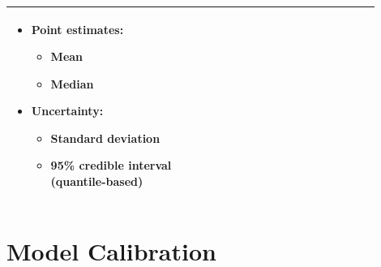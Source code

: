 \documentclass{article}
\begin{document}
\begin{appendix}
{\begin{table}[H]
\begin{tabular}{| p{0.45\linewidth} | p{0.45\linewidth} |}
\begin{itemize}
				\item Point estimates: 
				\begin{itemize}
					\item Mean 
					\item Median
				\end{itemize}
				\item Uncertainty: 
				\begin{itemize}
					\item Standard deviation
					\item 95\% credible interval (quantile-based)
				\end{itemize}
			\end{itemize}\\
		\hline 
	\end{tabular}
\end{table}}



\newpage
\section{Model Calibration}
\label{sec::PPC1}


\begin{landscape}



\end{landscape}























\end{appendix}
\end{document}
